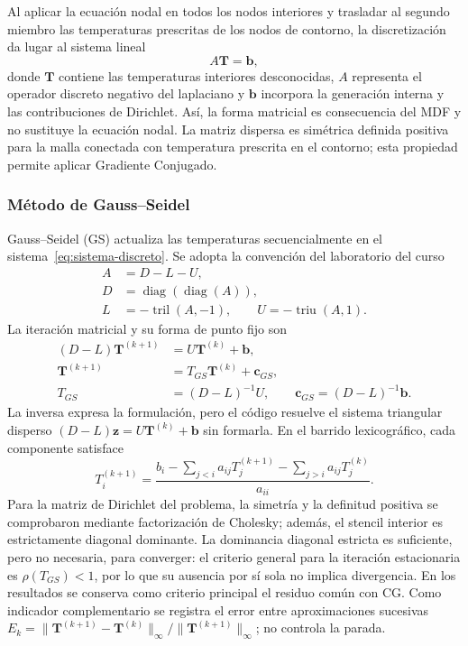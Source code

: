 Al aplicar la ecuaci\'on nodal en todos los nodos interiores y trasladar al segundo miembro las temperaturas prescritas de los nodos de contorno, la discretizaci\'on da lugar al sistema lineal
\begin{equation}
A\mathbf{T}=\mathbf{b},
\label{eq:sistema-discreto}
\end{equation}
donde $\mathbf{T}$ contiene las temperaturas interiores desconocidas, $A$ representa el operador discreto negativo del laplaciano y $\mathbf{b}$ incorpora la generaci\'on interna y las contribuciones de Dirichlet. As\'i, la forma matricial es consecuencia del MDF y no sustituye la ecuaci\'on nodal. La matriz dispersa es sim\'etrica definida positiva para la malla conectada con temperatura prescrita en el contorno; esta propiedad permite aplicar Gradiente Conjugado.

\subsubsection{M\'etodo de Gauss--Seidel}

Gauss--Seidel (GS) actualiza las temperaturas secuencialmente en el sistema~\eqref{eq:sistema-discreto}. Se adopta la convenci\'on del laboratorio del curso
\begin{equation}
\begin{aligned}
A&=D-L-U,\\
D&=\operatorname{diag}(\operatorname{diag}(A)),\\
L&=-\operatorname{tril}(A,-1),\qquad U=-\operatorname{triu}(A,1).
\end{aligned}
\end{equation}
La iteraci\'on matricial y su forma de punto fijo son
\begin{align}
(D-L)\mathbf{T}^{(k+1)}&=U\mathbf{T}^{(k)}+\mathbf{b},\\
\mathbf{T}^{(k+1)}&=T_{GS}\mathbf{T}^{(k)}+\mathbf{c}_{GS},\\
T_{GS}&=(D-L)^{-1}U,\qquad \mathbf{c}_{GS}=(D-L)^{-1}\mathbf{b}.
\label{eq:gs}
\end{align}
La inversa expresa la formulaci\'on, pero el c\'odigo resuelve el sistema triangular disperso $(D-L)\mathbf{z}=U\mathbf{T}^{(k)}+\mathbf{b}$ sin formarla. En el barrido lexicogr\'afico, cada componente satisface
\begin{equation}
T_i^{(k+1)}=\frac{b_i-\sum_{j<i}a_{ij}T_j^{(k+1)}-\sum_{j>i}a_{ij}T_j^{(k)}}{a_{ii}}.
\end{equation}
Para la matriz de Dirichlet del problema, la simetr\'ia y la definitud positiva se comprobaron mediante factorizaci\'on de Cholesky; adem\'as, el stencil interior es estrictamente diagonal dominante. La dominancia diagonal estricta es suficiente, pero no necesaria, para converger: el criterio general para la iteraci\'on estacionaria es $\rho(T_{GS})<1$, por lo que su ausencia por s\'i sola no implica divergencia. En los resultados se conserva como criterio principal el residuo com\'un con CG. Como indicador complementario se registra el error entre aproximaciones sucesivas $E_k=\|\mathbf{T}^{(k+1)}-\mathbf{T}^{(k)}\|_\infty/\|\mathbf{T}^{(k+1)}\|_\infty$; no controla la parada.

